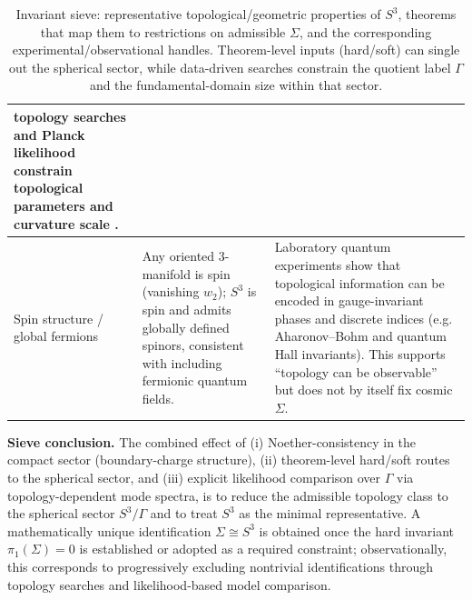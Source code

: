 \documentclass[
  reprint,
  amsmath,amssymb,
  aps,
  prd,
  superscriptaddress,
  nofootinbib,
  longbibliography
]{revtex4-2}
\newcommand{\Sthree}{S^{3}}
\newcommand{\Sig}{\Sigma}
\theoremstyle{definition}
\theoremstyle{remark}
\begin{document}
\begin{table}[t]
\begin{tabular}{p{} p{} p{}}
topology searches and Planck likelihood constrain topological parameters and curvature scale \cite{Planck2015Topology}.
\\
\hline
Spin structure / global fermions & Any oriented 3-manifold is spin (vanishing $w_2$); $\Sthree$ is spin and
admits globally defined spinors, consistent with including fermionic quantum fields. & Laboratory quantum
experiments show that topological information can be encoded in gauge-invariant phases and discrete
indices (e.g. Aharonov--Bohm and quantum Hall invariants)\cite{AharonovBohm1959,Klitzing1980,TKNN1982}.
This supports ``topology can be observable'' but does not by itself fix cosmic $\Sig$.
\\
\hline\hline
\end{tabular}
\caption{\label{tab:invariant_sieve}
Invariant sieve: representative topological/geometric properties of $S^{3}$, theorems that map them to
restrictions on admissible $\Sig$, and the corresponding experimental/observational handles.
Theorem-level inputs (hard/soft) can single out the spherical sector, while data-driven searches constrain
the quotient label $\Gamma$ and the fundamental-domain size within that sector.
}
\end{table}

\noindent\textbf{Sieve conclusion.}
The combined effect of (i) Noether-consistency in the compact sector (boundary-charge structure),
(ii) theorem-level hard/soft routes to the spherical sector, and
(iii) explicit likelihood comparison over $\Gamma$ via topology-dependent mode spectra,
is to reduce the admissible topology class to the spherical sector $\Sthree/\Gamma$ and to treat $\Sthree$
as the minimal representative. A mathematically unique identification $\Sig\cong \Sthree$ is obtained once
the hard invariant $\pi_{1}(\Sig)=0$ is established or adopted as a required constraint; observationally,
this corresponds to progressively excluding nontrivial identifications through topology searches and
likelihood-based model comparison.

\clearpage
\end{document}
